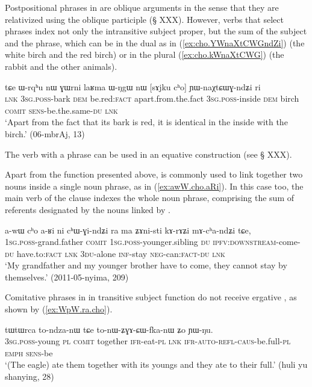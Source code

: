 Postpositional phrases in  are oblique arguments in the sense that they are relativized using the oblique participle (§ XXX). However, verbs that select  phrases index not only the intransitive subject proper, but the sum of the subject and the  phrase, which can be in the dual as in (\ref{ex:cho.YWnaXtCWGndZi}) (the white birch and the red birch) or in the plural (\ref{ex:cho.kWnaXtCWG}) (the rabbit and the other animals). 

\begin{exe}
\ex \label{ex:cho.YWnaXtCWGndZi}
\gll tɕe ɯ-rqʰu nɯ ɣɯrni laʁma ɯ-ŋgɯ nɯ [sɤjku cʰo] ɲɯ-naχtɕɯɣ-ndʑi ri\\
\textsc{lnk} \textsc{3sg}.\textsc{poss}-bark \textsc{dem} be.red:\textsc{fact} apart.from.the.fact \textsc{3sg}.\textsc{poss}-inside \textsc{dem} birch \textsc{comit} \textsc{sens}-be.the.same-\textsc{du} \textsc{lnk} \\
\glt `Apart from the fact that its bark is red, it is identical in the inside with the birch.' (06-mbrAj, 13)
\end{exe}

The verb  with a  phrase can be used in an equative construction (see § XXX).

 Apart from the function presented above,  is commonly used to link together two nouns inside a single noun phrase, as in (\ref{ex:awW.cho.aRi}). In this case too, the main verb of the clause indexes the whole noun phrase, comprising the sum of referents designated by the nouns linked by .

\begin{exe}
\ex \label{ex:awW.cho.aRi}
\gll a-wɯ cʰo a-ʁi ni cʰɯ-ɣi-ndʑi ra ma ʑɤni-sti kɤ-rɤʑi mɤ-cʰa-ndʑi tɕe, \\
\textsc{1sg}.\textsc{poss}-grand.father \textsc{comit} \textsc{1sg}.\textsc{poss}-younger.sibling \textsc{du} \textsc{ipfv}:\textsc{downstream}-come-\textsc{du} have.to:\textsc{fact} \textsc{lnk} \textsc{3du}-alone \textsc{inf}-stay \textsc{neg}-can:\textsc{fact}-\textsc{du} \textsc{lnk} \\ 
\glt `My grandfather and my younger brother have to come, they cannot stay by themselves.' (2011-05-nyima, 209)
\end{exe}

Comitative phrases in  in transitive subject function do not receive ergative , as shown by (\ref{ex:WpW.ra.cho}).

\begin{exe}
\ex \label{ex:WpW.ra.cho}
\gll [ɯ-pɯ ra cʰo] tɯtɯrca to-ndza-nɯ tɕe to-nɯ-ʑɣɤ-ɕɯ-fka-nɯ ʑo ɲɯ-ŋu. \\
\textsc{3sg}.\textsc{poss}-young \textsc{pl} \textsc{comit} together \textsc{ifr}-eat-\textsc{pl} \textsc{lnk} \textsc{ifr}-\textsc{auto}-\textsc{refl}-\textsc{caus}-be.full-\textsc{pl} \textsc{emph} \textsc{sens}-be \\
\glt `(The eagle) ate them together with its youngs and they ate to their full.' (huli yu shanying, 28)
\end{exe}


